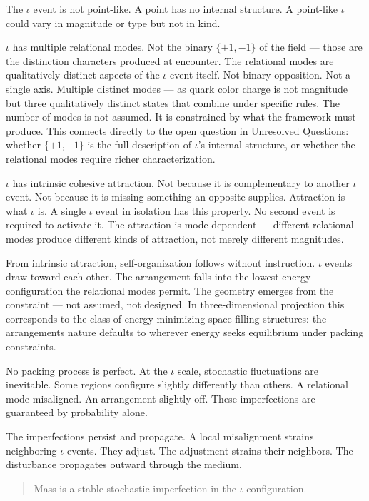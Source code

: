 \documentclass[11pt,letterpaper]{article}
\begin{document}
The \(\iota\) event is not point-like. A point has no internal structure. A point-like \(\iota\) could vary in magnitude or type but not in kind.

\(\iota\) has multiple relational modes. Not the binary \(\{+1,-1\}\) of the field --- those are the distinction characters produced at encounter. The relational modes are qualitatively distinct aspects of the \(\iota\) event itself. Not binary opposition. Not a single axis. Multiple distinct modes --- as quark color charge is not magnitude but three qualitatively distinct states that combine under specific rules. The number of modes is not assumed. It is constrained by what the framework must produce. This connects directly to the open question in Unresolved Questions: whether \(\{+1,-1\}\) is the full description of \(\iota\)'s internal structure, or whether the relational modes require richer characterization.

\(\iota\) has intrinsic cohesive attraction. Not because it is complementary to another \(\iota\) event. Not because it is missing something an opposite supplies. Attraction is what \(\iota\) is. A single \(\iota\) event in isolation has this property. No second event is required to activate it. The attraction is mode-dependent --- different relational modes produce different kinds of attraction, not merely different magnitudes.

From intrinsic attraction, self-organization follows without instruction. \(\iota\) events draw toward each other. The arrangement falls into the lowest-energy configuration the relational modes permit. The geometry emerges from the constraint --- not assumed, not designed. In three-dimensional projection this corresponds to the class of energy-minimizing space-filling structures: the arrangements nature defaults to wherever energy seeks equilibrium under packing constraints.

No packing process is perfect. At the \(\iota\) scale, stochastic fluctuations are inevitable. Some regions configure slightly differently than others. A relational mode misaligned. An arrangement slightly off. These imperfections are guaranteed by probability alone.

The imperfections persist and propagate. A local misalignment strains neighboring \(\iota\) events. They adjust. The adjustment strains their neighbors. The disturbance propagates outward through the medium.

\begin{quote}
Mass is a stable stochastic imperfection in the \(\iota\) configuration.
\end{quote}
\end{document}
